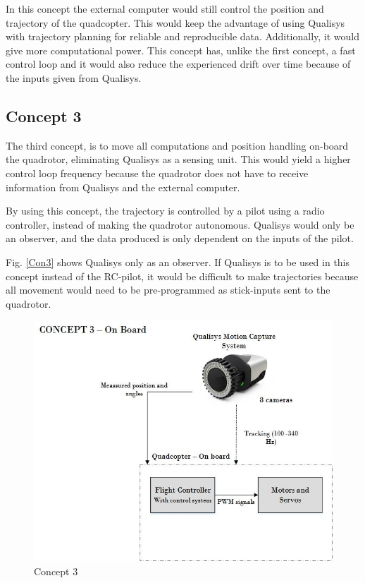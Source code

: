 In this concept the external computer would still control the position and trajectory of the quadcopter. This would keep the advantage of using Qualisys with trajectory planning for reliable and reproducible data. Additionally, it would give more computational power. This concept has, unlike the first concept, a fast control loop and it would also reduce the experienced drift over time because of the inputs given from Qualisys.\bigskip



\clearpage

\subsection{Concept 3}
The third concept, is to move all computations and position handling on-board the quadrotor, eliminating Qualisys as a sensing unit. This would yield a higher control loop frequency because the quadrotor does not have to receive information from Qualisys and the external computer. \bigskip

By using this concept, the trajectory is controlled by a pilot using a radio controller, instead of making the quadrotor autonomous. Qualisys would only be an observer, and the data produced is only dependent on the inputs of the pilot. \bigskip

Fig. \ref{Con3} shows Qualisys only as an observer. If Qualisys is to be used in this concept instead of the RC-pilot, it would be difficult to make trajectories because all movement would need to be pre-programmed as stick-inputs sent to the quadrotor. 

\begin{figure}[H]
          \centering
            \includegraphics[scale = 0.67]{VAPIQ-PICTURES/Concept3.jpg}
                \caption{Concept 3}
                \label{Con3}
            \label{dir}
\end{figure} 

